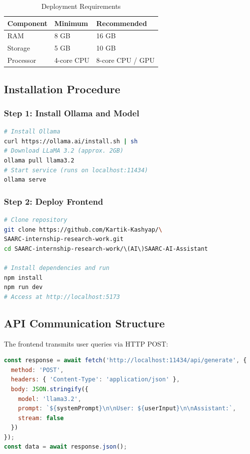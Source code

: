 \documentclass[12pt,a4paper]{report}
\begin{document}
\begin{table}[H]
\centering
\caption{Deployment Requirements}
\begin{tabular}{lll}
\toprule
\textbf{Component} & \textbf{Minimum} & \textbf{Recommended} \\
\midrule
RAM & 8 GB & 16 GB \\
Storage & 5 GB & 10 GB \\
Processor & 4-core CPU & 8-core CPU / GPU \\
\bottomrule
\end{tabular}
\end{table}

\subsection{Installation Procedure}

\subsubsection{Step 1: Install Ollama and Model}
\begin{lstlisting}[language=bash, caption={Ollama Setup}]
# Install Ollama
curl https://ollama.ai/install.sh | sh
# Download LLaMA 3.2 (approx. 2GB)
ollama pull llama3.2
# Start service (runs on localhost:11434)
ollama serve
\end{lstlisting}

\subsubsection{Step 2: Deploy Frontend}
\begin{lstlisting}[language=bash, caption={React Application Setup}]
# Clone repository
git clone https://github.com/Kartik-Kashyap/\
SAARC-internship-research-work.git
cd SAARC-internship-research-work/\(AI\)SAARC-AI-Assistant

# Install dependencies and run
npm install
npm run dev
# Access at http://localhost:5173
\end{lstlisting}

\subsection{API Communication Structure}

The frontend transmits user queries via HTTP POST:

\begin{lstlisting}[language=JavaScript, caption={API Request Implementation}, basicstyle=\ttfamily\scriptsize]
const response = await fetch('http://localhost:11434/api/generate', {
  method: 'POST',
  headers: { 'Content-Type': 'application/json' },
  body: JSON.stringify({
    model: 'llama3.2',
    prompt: `${systemPrompt}\n\nUser: ${userInput}\n\nAssistant:`,
    stream: false
  })
});
const data = await response.json();
\end{lstlisting}
\end{document}
